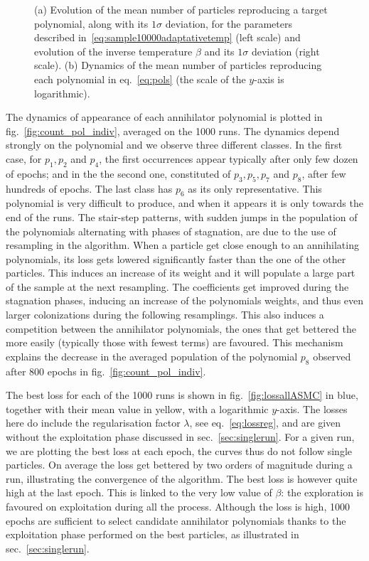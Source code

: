 \documentclass[11pt,a4paper]{article}
\begin{document}
\begin{figure}
{
		}
		\subfigure{\label{fig:count_pol_indiv}}
		\vspace{-1cm}
		\caption{(a) Evolution of the mean number of particles reproducing a target polynomial, along with its $1\sigma$ deviation, for the parameters described in~\eqref{eq:sample10000adaptativetemp} (left scale) and evolution of the inverse temperature $\beta$ and its $1\sigma$ deviation (right scale). (b) Dynamics of the mean number of particles reproducing each polynomial in eq.~\eqref{eq:pols} (the scale of the $y$-axis is logarithmic).}
		\label{fig:evolutionoftargetreproduction}
	\end{figure}

	The dynamics of appearance of each annihilator polynomial is plotted in fig.~\ref{fig:count_pol_indiv}, averaged on the 1000 runs. The dynamics depend strongly on the polynomial and we observe three different classes. In the first case, for $p_{1}, p_{2}$ and $p_{4}$, the first occurrences appear typically after only few dozen of epochs; and in the the second one, constituted of $p_{3}, p_{5}, p_{7}$ and $p_{8}$, after few hundreds of epochs. The last class has $p_{6}$ as its only representative. This polynomial is very difficult to produce, and when it appears it is only towards the end of the runs. The stair-step patterns, with sudden jumps in the population of the polynomials alternating with phases of stagnation, are due to the use of resampling in the algorithm. When a particle get close enough to an annihilating polynomials, its loss gets lowered significantly faster than the one of the other particles. This induces an increase of its weight and it will populate a large part of the sample at the next resampling. The coefficients get improved during the stagnation phases, inducing an increase of the polynomials weights, and thus even larger colonizations during the following resamplings. This also induces a competition between the annihilator polynomials, the ones that get bettered the more easily (typically those with fewest terms) are favoured. This mechanism explains the decrease in the averaged population of the polynomial $p_{8}$ observed after 800 epochs in fig.~\ref{fig:count_pol_indiv}.

	The best loss for each of the 1000 runs is shown in fig.~\ref{fig:lossallASMC} in blue, together with their mean value in yellow, with a logarithmic $y$-axis. The losses here do include the regularisation factor $\lambda$, see eq.~\eqref{eq:lossreg}, and are given without the exploitation phase discussed in sec.~\ref{sec:singlerun}. For a given run, we are plotting the best loss at each epoch, the curves thus do not follow single particles. On average the loss get bettered by two orders of magnitude during a run, illustrating the convergence of the algorithm. The best loss is however quite high at the last epoch. This is linked to the very low value of $\beta$: the exploration is favoured on exploitation during all the process. Although the loss is high, 1000 epochs are sufficient to select candidate annihilator polynomials thanks to the exploitation phase performed on the best particles, as illustrated in sec.~\ref{sec:singlerun}.
\end{document}

